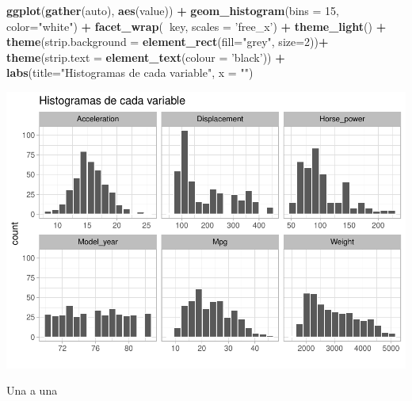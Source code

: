 \documentclass[
]{article}
\newenvironment{Shaded}{\begin{snugshade}}{\end{snugshade}}
\newcommand{\DataTypeTok}[1]{\textcolor[rgb]{0.13,0.29,0.53}{#1}}
\newcommand{\DecValTok}[1]{\textcolor[rgb]{0.00,0.00,0.81}{#1}}
\newcommand{\KeywordTok}[1]{\textcolor[rgb]{0.13,0.29,0.53}{\textbf{#1}}}
\newcommand{\NormalTok}[1]{#1}
\newcommand{\OperatorTok}[1]{\textcolor[rgb]{0.81,0.36,0.00}{\textbf{#1}}}
\newcommand{\StringTok}[1]{\textcolor[rgb]{0.31,0.60,0.02}{#1}}
\begin{document}
\begin{Shaded}
\begin{Highlighting}[]
\KeywordTok{ggplot}\NormalTok{(}\KeywordTok{gather}\NormalTok{(auto), }\KeywordTok{aes}\NormalTok{(value)) }\OperatorTok{+}
\StringTok{  }\KeywordTok{geom_histogram}\NormalTok{(}\DataTypeTok{bins =} \DecValTok{15}\NormalTok{, }\DataTypeTok{color=}\StringTok{"white"}\NormalTok{) }\OperatorTok{+}
\StringTok{  }\KeywordTok{facet_wrap}\NormalTok{(}\OperatorTok{~}\NormalTok{key, }\DataTypeTok{scales =} \StringTok{'free_x'}\NormalTok{) }\OperatorTok{+}
\StringTok{  }\KeywordTok{theme_light}\NormalTok{() }\OperatorTok{+}
\StringTok{  }\KeywordTok{theme}\NormalTok{(}\DataTypeTok{strip.background =} \KeywordTok{element_rect}\NormalTok{(}\DataTypeTok{fill=}\StringTok{"grey"}\NormalTok{, }\DataTypeTok{size=}\DecValTok{2}\NormalTok{))}\OperatorTok{+}
\StringTok{  }\KeywordTok{theme}\NormalTok{(}\DataTypeTok{strip.text =} \KeywordTok{element_text}\NormalTok{(}\DataTypeTok{colour =} \StringTok{'black'}\NormalTok{)) }\OperatorTok{+}
\StringTok{  }\KeywordTok{labs}\NormalTok{(}\DataTypeTok{title=}\StringTok{"Histogramas de cada variable"}\NormalTok{, }\DataTypeTok{x =} \StringTok{""}\NormalTok{)}
\end{Highlighting}
\end{Shaded}

\begin{center}\includegraphics{EDA_files/figure-latex/unnamed-chunk-6-1} \end{center}

Una a una
\end{document}
